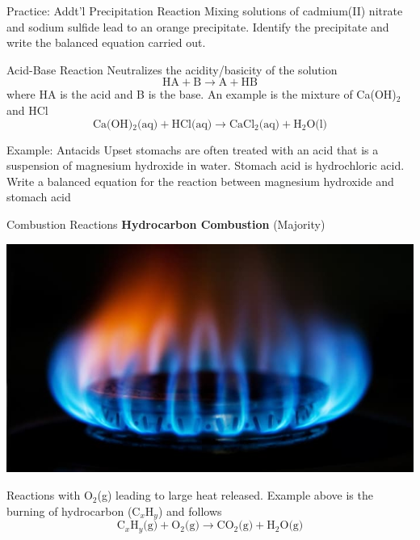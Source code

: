 \documentclass[11pt]{beamer}
\begin{document}
\begin{frame}{Practice: Addt'l Precipitation Reaction}
  Mixing solutions of cadmium(II) nitrate and sodium sulfide lead to an orange
  precipitate. Identify the precipitate and write the balanced equation carried
  out.
  \vfill
\end{frame}

\begin{frame}{Acid-Base Reaction}
  Neutralizes the acidity/basicity of the solution
  \begin{equation}
    \text{HA} + \text{B} \rightarrow \text{A} + \text{HB}
  \end{equation}
  where HA is the acid and B is the base. An example is
  the mixture of Ca(OH)$_2$ and HCl
  \begin{equation}
    \text{Ca(OH)$_2$(aq)} + \text{HCl(aq)} \rightarrow \text{CaCl$_2$(aq)} +\text{H$_2$O(l)}
  \end{equation}
\end{frame}

\begin{frame}{Example: Antacids}
  Upset stomachs are often treated with an acid that is a suspension of
  magnesium hydroxide in water. Stomach acid is hydrochloric acid. Write
  a balanced equation for the reaction between magnesium hydroxide and
  stomach acid
\end{frame}

\begin{frame}{Combustion Reactions}
  \textbf{Hydrocarbon Combustion} (Majority)
  \begin{center}
    \includegraphics[scale=0.25]{stove_gas}
  \end{center}
  
  Reactions with O$_2$(g) leading to large heat released. Example
  above is the burning of hydrocarbon (C$_x$H$_y$) and follows
  \begin{equation}
    \text{C$_x$H$_y$(g)} + \text{O$_2$(g)} \rightarrow \text{CO$_2$(g)}
    + \text{H$_2$O(g)}
  \end{equation}
\end{frame}
\end{document}
